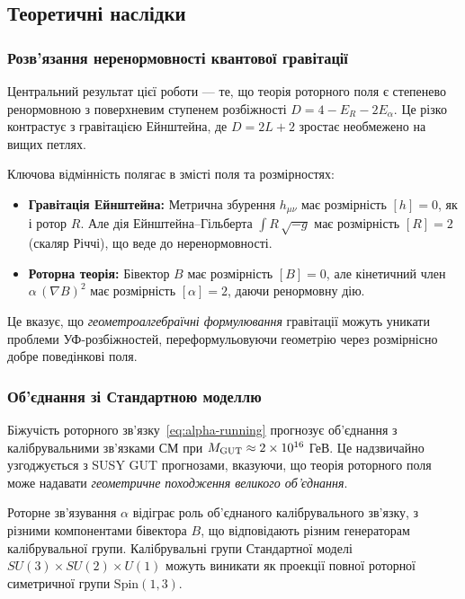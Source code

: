 \documentclass[11pt,a4paper]{article}
\numberwithin{equation}{section}
\theoremstyle{plain}
\theoremstyle{definition}
\theoremstyle{remark}
\newcommand{\Spin}{\mathrm{Spin}}
\begin{document}
\subsection{Теоретичні наслідки}

\subsubsection{Розв'язання неренормовності квантової гравітації}

Центральний результат цієї роботи — те, що теорія роторного поля є степенево ренормовною з поверхневим ступенем розбіжності $D=4-E_R-2E_\alpha$. Це різко контрастує з гравітацією Ейнштейна, де $D=2L+2$ зростає необмежено на вищих петлях.

Ключова відмінність полягає в змісті поля та розмірностях:
\begin{itemize}
  \item \textbf{Гравітація Ейнштейна:} Метрична збурення $h_{\mu\nu}$ має розмірність $[h]=0$, як і ротор $R$. Але дія Ейнштейна–Гільберта $\int R\,\sqrt{-g}$ має розмірність $[R]=2$ (скаляр Річчі), що веде до неренормовності.
  \item \textbf{Роторна теорія:} Бівектор $B$ має розмірність $[B]=0$, але кінетичний член $\alpha\,(\nabla B)^2$ має розмірність $[\alpha]=2$, даючи ренормовну дію.
\end{itemize}

Це вказує, що \emph{геометроалгебраїчні формулювання} гравітації можуть уникати проблеми УФ-розбіжностей, переформульовуючи геометрію через розмірнісно добре поведінкові поля.

\subsubsection{Об'єднання зі Стандартною моделлю}

Біжучість роторного зв'язку~\eqref{eq:alpha-running} прогнозує об'єднання з калібрувальними зв'язками СМ при $M_{\rm GUT}\approx 2\times 10^{16}$ ГеВ. Це надзвичайно узгоджується з SUSY GUT прогнозами, вказуючи, що теорія роторного поля може надавати \emph{геометричне походження великого об'єднання}.

Роторне зв'язування $\alpha$ відіграє роль об'єднаного калібрувального зв'язку, з різними компонентами бівектора $B$, що відповідають різним генераторам калібрувальної групи. Калібрувальні групи Стандартної моделі $SU(3)\times SU(2)\times U(1)$ можуть виникати як проекції повної роторної симетричної групи $\Spin(1,3)$.
\end{document}

